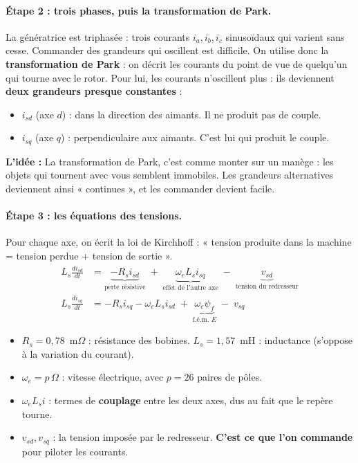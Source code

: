 \documentclass[11pt,a4paper]{article}
\newcommand{\Idee}{\textbf{L'idée : }}
\begin{document}
\paragraph{Étape 2 : trois phases, puis la transformation de Park.}
La génératrice est triphasée : trois courants $i_a, i_b, i_c$ sinusoïdaux qui varient sans cesse.
Commander des grandeurs qui oscillent est difficile. On utilise donc la \textbf{transformation de Park} :
on décrit les courants du point de vue de quelqu'un qui tourne avec le rotor. Pour lui, les courants
n'oscillent plus : ils deviennent \textbf{deux grandeurs presque constantes} :
\begin{itemize}
\item $i_{sd}$ (axe $d$) : dans la direction des aimants. Il ne produit pas de couple.
\item $i_{sq}$ (axe $q$) : perpendiculaire aux aimants. C'est lui qui produit le couple.
\end{itemize}
\begin{idee}
\Idee
La transformation de Park, c'est comme monter sur un manège : les objets qui tournent avec vous
semblent immobiles. Les grandeurs alternatives deviennent ainsi « continues », et les commander devient facile.
\end{idee}

\paragraph{Étape 3 : les équations des tensions.}
Pour chaque axe, on écrit la loi de Kirchhoff : « tension produite dans la machine = tension perdue + tension de sortie ».
\begin{align}
L_s\frac{di_{sd}}{dt} &= \underbrace{-R_s i_{sd}}_{\text{perte résistive}}
\;+\;\underbrace{\omega_e L_s i_{sq}}_{\text{effet de l'autre axe}}
\;-\;\underbrace{v_{sd}}_{\text{tension du redresseur}}\\
L_s\frac{di_{sq}}{dt} &= -R_s i_{sq} - \omega_e L_s i_{sd}
\;+\;\underbrace{\omega_e\psi_f}_{\text{f.é.m. }E} \;-\; v_{sq}
\end{align}
\begin{itemize}
\item $R_s=0{,}78$~m$\Omega$ : résistance des bobines. $L_s=1{,}57$~mH : inductance (s'oppose à la variation du courant).
\item $\omega_e = p\,\Omega$ : vitesse électrique, avec $p=26$ paires de pôles.
\item $\omega_e L_s i$ : termes de \textbf{couplage} entre les deux axes, dus au fait que le repère tourne.
\item $v_{sd}, v_{sq}$ : la tension imposée par le redresseur. \textbf{C'est ce que l'on commande} pour piloter les courants.
\end{itemize}
\end{document}

